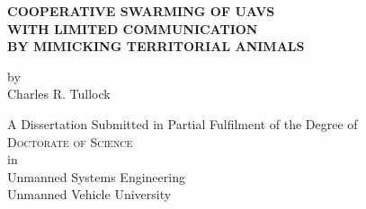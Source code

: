 
\begin{titlepage}
	\begin{center}

		\vspace*{1cm}
		 
		\large{ \textbf{ \uppercase{Cooperative swarming of UAVs\\with limited communication\\ by mimicking territorial animals}}}

		
		
		
		\vspace{1.5cm}
		
		by\\
		Charles R. Tullock\\
		
		\vspace{1.5cm}

		A Dissertation Submitted in Partial Fulfilment of the Degree of\\
		\large{\textsc{Doctorate of Science}}\\
		in\\
		\large{Unmanned Systems Engineering}\\
		\vspace{1cm}
		\large{Unmanned Vehicle University}\\		
		

\end{center}
\end{titlepage}
